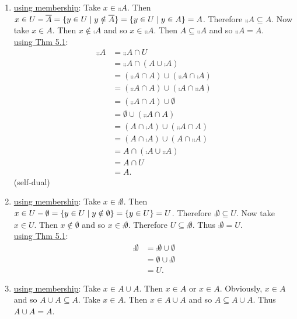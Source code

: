 \documentclass[12pt]{book}
\begin{document}
\begin{enumerate}
{\begin{enumerate}
\item %
\underline{using membership}: Take $x \in \comp{\comp{A}}$. Then $x \in U - \overline{A} = \{y \in U \mid y \notin \overline{A}\} = \{y \in U \mid y \in A\} = A$. Therefore $\comp{\comp{A}} \subseteq A$. Now take $x \in A$. Then $x \notin \comp{A}$ and so $x \in \comp{\comp{A}}$. Then $A \subseteq \comp{\comp{A}}$ and so $\comp{\comp{A}} = A$.\\
\underline{using Thm 5.1}: \begin{align*}\comp{\comp{A}} &= \comp{\comp{A}} \cap U \tag{5.1.4'}\\&= \comp{\comp{A}} \cap (A \cup \comp{A}) \tag{5.1.5}\\&= (\comp{\comp{A}} \cap A) \cup (\comp{\comp{A}} \cap \comp{A}) \tag{5.1.3'}\\&= (\comp{\comp{A}} \cap A) \cup (\comp{A} \cap \comp{\comp{A}}) \tag{5.1.2'}\\&= (\comp{\comp{A}} \cap A) \cup \emptyset \tag{5.1.5'}\\&= \emptyset \cup (\comp{\comp{A}} \cap A)\tag{5.1.2}\\&= (A \cap \comp{A}) \cup (\comp{\comp{A}} \cap A)\tag{5.1.5'}\\&= (A \cap \comp{A}) \cup (A \cap \comp{\comp{A}})\tag{5.1.2'}\\&= A \cap (\comp{A} \cup \comp{\comp{A}})\tag{5.1.3'}\\&= A \cap U\tag{5.1.5}\\&= A.\tag{5.1.4'}\end{align*} (self-dual)
\item %
\underline{using membership}: Take $x \in \comp{\emptyset}$. Then $x \in U - \emptyset = \{y \in U \mid y \notin \emptyset\} = \{y \in U\} = U$. Therefore $\comp{\emptyset} \subseteq U$. Now take $x \in U$. Then $x \notin \emptyset$ and so $x \in \comp{\emptyset}$. Therefore $U \subseteq \comp{\emptyset}$. Thus $\comp{\emptyset} = U$.\\
\underline{using Thm 5.1}: \begin{align*}\comp{\emptyset} &= \comp{\emptyset} \cup \emptyset \tag{5.1.4}\\&= \emptyset \cup \comp{\emptyset} \tag{5.1.2}\\&= U.\tag{5.1.5}\end{align*}
\item %
\underline{using membership}: Take $x \in A \cup A$. Then $x \in A$ or $x \in A$. Obviously, $x \in A$ and so $A \cup A \subseteq A$. Take $x \in A$. Then $x \in A \cup A$ and so $A \subseteq A \cup A$. Thus $A \cup A = A$.\\

\end{enumerate}}
\end{enumerate}
\end{document}

